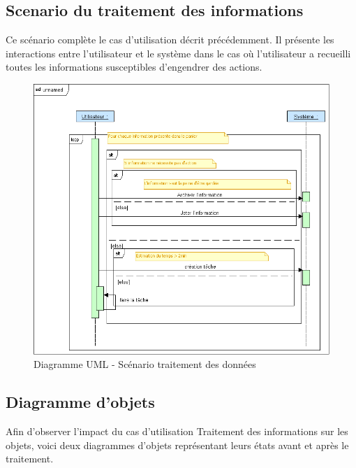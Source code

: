 




\subsection*{Scenario du traitement des informations}

Ce scénario complète le cas d'utilisation décrit précédemment. Il présente les interactions entre l'utilisateur et le système dans le cas où l'utilisateur a recueilli toutes les informations susceptibles d'engendrer des actions.


	\begin{figure}[H]
	\begin{center}
	\includegraphics[scale=0.5]{diagrams/scenario_traitement.png}
	\caption{Diagramme UML  - Scénario traitement des données}
	\end{center}
	\end{figure}
	
	\bigskip

\subsection*{Diagramme d'objets} 

Afin d'observer l'impact du cas d'utilisation Traitement des informations sur les objets, voici deux diagrammes d'objets représentant leurs états avant et après le traitement.

